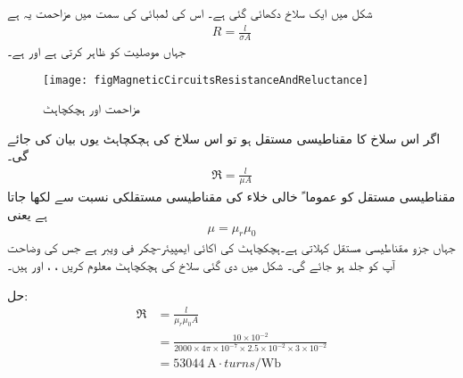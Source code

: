 شکل   میں ایک سلاخ دکھائی گئی ہے۔ اس کی لمبائی کی سمت میں مزاحمت  یہ ہے
\begin{align}\label{مساوات_مقناطیسی_دور_مزاحمت_کی_تعریف}
R=\frac{l }{\sigma A}
\end{align}
جہاں   موصلیت کو ظاہر کرتی ہے اور   ہے۔
\begin{figure}
\centering
\texttt{[image: figMagneticCircuitsResistanceAndReluctance]}
\caption{مزاحمت اور ہچکچاہٹ}
\label{شکل_مقناطیسی_دور_مزاحمت_ہچکچاہٹ}
\end{figure}
اگر اس سلاخ کا مقناطیسی مستقل   ہو تو اس سلاخ کی ہچکچاہٹ   یوں بیان کی جائے گی۔
\begin{align}\label{مساوات_مقناطیسی_دور_ہچکچاہٹ_کی_تعریف}
\Re = \frac{l}{\mu A}
\end{align}
مقناطیسی مستقل  کو عموما ً خالی خلاء کی مقناطیسی مستقلکی  نسبت سے لکھا جاتا ہے یعنی
\begin{align}
\mu=\mu_r \mu_0
\end{align}
جہاں  جزو مقناطیسی مستقل  کہلاتی ہے۔ہچکچاہٹ کی اکائی ایمپیئر-چکر فی ویبر  ہے جس کی وضاحت آپ کو جلد ہو جائے گی۔
%
شکل  میں دی گئی سلاخ کی ہچکچاہٹ معلوم کریں
، ،  اور  ہیں۔

حل:
\begin{align*}
\Re& = \frac{l}{\mu_r \mu_0 A}\\
&=\frac{10\times 10^{-2}}{2000 \times 4 \pi \times 10^{-7} \times 2.5 \times 10^{-2} \times 3 \times 10^{-2}}\\
&=\SI{53044}{\ampere \cdot turns \per \weber}
\end{align*}

